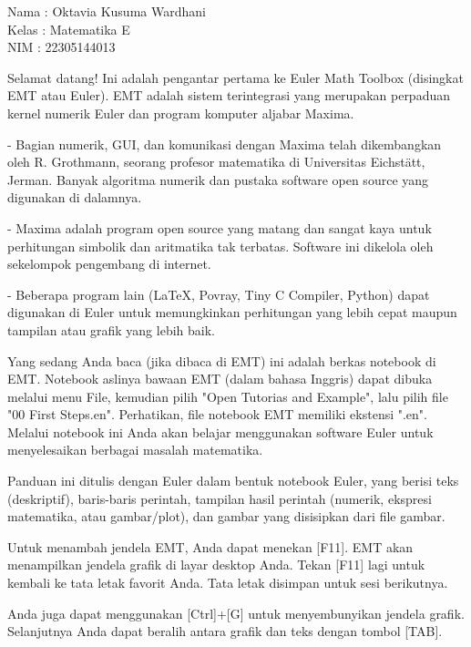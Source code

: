 \documentclass{article}
\begin{document}
\begin{eulernotebook}
\begin{eulercomment}
Nama  : Oktavia Kusuma Wardhani\\
Kelas : Matematika E\\
NIM   : 22305144013

\end{eulercomment}
\eulersubheading{}
\begin{eulercomment}
Selamat datang! Ini adalah pengantar pertama ke Euler Math Toolbox
(disingkat EMT atau Euler). EMT adalah sistem terintegrasi yang
merupakan perpaduan kernel numerik Euler dan program komputer aljabar
Maxima.

- Bagian numerik, GUI, dan komunikasi dengan Maxima telah dikembangkan
oleh R. Grothmann, seorang profesor matematika di Universitas
Eichstätt, Jerman. Banyak algoritma numerik dan pustaka software open
source yang digunakan di dalamnya.

- Maxima adalah program open source yang matang dan sangat kaya untuk
perhitungan simbolik dan aritmatika tak terbatas. Software ini
dikelola oleh sekelompok pengembang di internet.

- Beberapa program lain (LaTeX, Povray, Tiny C Compiler, Python) dapat
digunakan di Euler untuk memungkinkan perhitungan yang lebih cepat
maupun tampilan atau grafik yang lebih baik.

Yang sedang Anda baca (jika dibaca di EMT) ini adalah berkas notebook
di EMT. Notebook aslinya bawaan EMT (dalam bahasa Inggris) dapat
dibuka melalui menu File, kemudian pilih "Open Tutorias and Example",
lalu pilih file "00 First Steps.en". Perhatikan, file notebook EMT
memiliki ekstensi ".en". Melalui notebook ini Anda akan belajar
menggunakan software Euler untuk menyelesaikan berbagai masalah
matematika.
\end{eulercomment}
\begin{eulercomment}
Panduan ini ditulis dengan Euler dalam bentuk notebook Euler, yang
berisi teks (deskriptif), baris-baris perintah, tampilan hasil
perintah (numerik, ekspresi matematika, atau gambar/plot), dan gambar
yang disisipkan dari file gambar.

Untuk menambah jendela EMT, Anda dapat menekan [F11]. EMT akan
menampilkan jendela grafik di layar desktop Anda. Tekan [F11] lagi
untuk kembali ke tata letak favorit Anda. Tata letak disimpan untuk
sesi berikutnya.

Anda juga dapat menggunakan [Ctrl]+[G] untuk menyembunyikan jendela
grafik. Selanjutnya Anda dapat beralih antara grafik dan teks dengan
tombol [TAB].


\end{eulercomment}
\end{eulernotebook}
\end{document}
